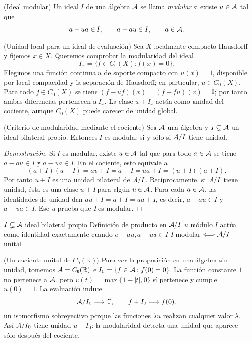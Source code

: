 \begin{cthdefinicion}{(Ideal modular)}
Un ideal $I$ de una álgebra $\mathcal A$ se llama \emph{modular} si existe $u\in\mathcal A$ tal que
\[
 a-ua\in I,\qquad a-au\in I,\qquad a\in\mathcal A.
\]
\end{cthdefinicion}

\begin{cthejemplo}{(Unidad local para un ideal de evaluación)}
Sea $X$ localmente compacto Hausdorff y fijemos $x\in X$.
Queremos comprobar la modularidad del ideal
\[
 I_x=\{f\in C_0(X):f(x)=0\}.
\]
Elegimos una función continua $u$ de soporte compacto con
$u(x)=1$, disponible por local compacidad y la separación de Hausdorff;
en particular, $u\in C_0(X)$.
Para todo $f\in C_0(X)$ se tiene
$(f-uf)(x)=(f-fu)(x)=0$; por tanto ambas diferencias pertenecen a
$I_x$. La clase $u+I_x$ actúa como unidad del cociente, aunque
$C_0(X)$ puede carecer de unidad global.
\end{cthejemplo}

\begin{cthproposicion}{(Criterio de modularidad mediante el cociente)}
Sea $\mathcal A$ una álgebra y $I\subsetneq\mathcal A$ un ideal bilateral propio.
Entonces $I$ es modular si y sólo si $\mathcal A/I$ tiene unidad.
\end{cthproposicion}

\begin{proof}[Demostración]
Si $I$ es modular, existe $u\in\mathcal A$ tal que para todo
$a\in\mathcal A$ se tiene $a-au\in I$ y $a-ua\in I$. En el
cociente, esto equivale a
\[
 (a+I)(u+I)=au+I=a+I=ua+I=(u+I)(a+I).
\]
Por tanto $u+I$ es una unidad bilateral de $\mathcal A/I$.
Recíprocamente, si $\mathcal A/I$ tiene unidad, ésta es una clase
$u+I$ para algún $u\in\mathcal A$. Para cada $a\in\mathcal A$, las
identidades de unidad dan $au+I=a+I=ua+I$, es decir,
$a-au\in I$ y $a-ua\in I$. Ese $u$ prueba que $I$ es
modular.
\end{proof}

\proofdiagram
{$I\subsetneq\mathcal A$ ideal bilateral propio}
{Definición de producto en $\mathcal A/I$}
{$u$ módulo $I$ actúa como identidad exactamente cuando $a-au,a-ua\in I$}
{$I$ modular $\Longleftrightarrow \mathcal A/I$ unital}

\begin{cthejemplo}{(Un cociente unital de $C_0(\mathbb R)$)}
Para ver la proposición en una álgebra sin unidad, tomemos
$\mathcal A=C_0(\mathbb R)$ e
$I_0=\{f\in\mathcal A:f(0)=0\}$. La función constante $1$ no pertenece
a $\mathcal A$, pero $u(t)=\max\{1-|t|,0\}$ sí pertenece y cumple $u(0)=1$.
La evaluación induce
\[
 \mathcal A/I_0\longrightarrow\mathbb C,\qquad f+I_0\longmapsto f(0),
\]
un isomorfismo sobreyectivo porque las funciones $\lambda u$ realizan
cualquier valor $\lambda$. Así $\mathcal A/I_0$ tiene unidad $u+I_0$:
la modularidad detecta una unidad que aparece sólo después del cociente.
\end{cthejemplo}
